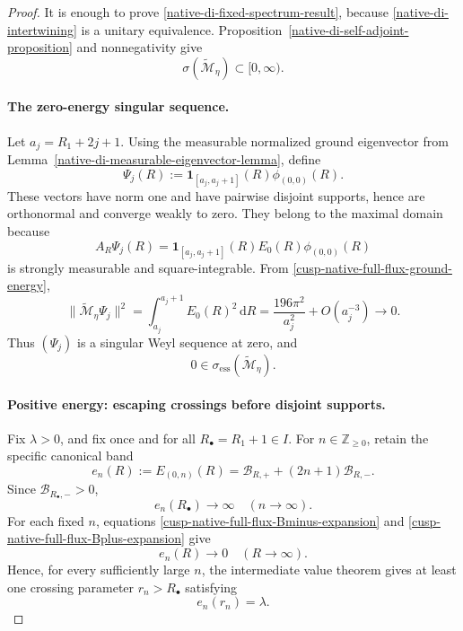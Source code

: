 \begin{proof}
It is enough to prove \eqref{native-di-fixed-spectrum-result}, because
\eqref{native-di-intertwining} is a unitary equivalence.
Proposition~\ref{native-di-self-adjoint-proposition} and nonnegativity give
\[
 \sigma(\widetilde{\mathscr M}_\eta)\subset[0,\infty).
\]

\paragraph{The zero-energy singular sequence.}
Let \(a_j=R_1+2j+1\).  Using the measurable normalized ground eigenvector
from Lemma~\ref{native-di-measurable-eigenvector-lemma}, define
\[
 \Psi_j(R)
 :=\mathbf 1_{[a_j,a_j+1]}(R)\phi_{(0,0)}(R).
\]
These vectors have norm one and have pairwise disjoint supports, hence are
orthonormal and converge weakly to zero.  They belong to the maximal
domain because
\[
 A_R\Psi_j(R)=
 \mathbf 1_{[a_j,a_j+1]}(R)E_0(R)\phi_{(0,0)}(R)
\]
is strongly measurable and square-integrable.  From
\eqref{cusp-native-full-flux-ground-energy},
\[
 \|\widetilde{\mathscr M}_\eta\Psi_j\|^2
 =\int_{a_j}^{a_j+1}E_0(R)^2\,\mathrm d R
 =\frac{196\pi^2}{a_j^2}+O(a_j^{-3})
 \longrightarrow0.
\]
Thus \((\Psi_j)\) is a singular Weyl sequence at zero, and
\[
 0\in\sigma_{\mathrm{ess}}(\widetilde{\mathscr M}_\eta).
\]

\paragraph{Positive energy: escaping crossings before disjoint supports.}
Fix \(\lambda>0\), and fix once and for all
\(R_\bullet=R_1+1\in I\).  For \(n\in\mathbb Z_{\ge0}\), retain the
specific canonical band
\begin{equation}
 e_n(R):=E_{(0,n)}(R)
 =\mathcal B_{R,+}+(2n+1)\mathcal B_{R,-}.
\label{native-di-crossing-band}
\end{equation}
Since \(\mathcal B_{R_\bullet,-}>0\),
\[
 e_n(R_\bullet)\longrightarrow\infty
 \quad(n\to\infty).
\]
For each fixed \(n\), equations
\eqref{cusp-native-full-flux-Bminus-expansion} and
\eqref{cusp-native-full-flux-Bplus-expansion} give
\[
 e_n(R)\longrightarrow0
 \quad(R\to\infty).
\]
Hence, for every sufficiently large \(n\), the intermediate value theorem
gives at least one crossing parameter \(r_n>R_\bullet\) satisfying
\begin{equation}
 e_n(r_n)=\lambda.
\label{native-di-crossing}
\end{equation}


\end{proof}

